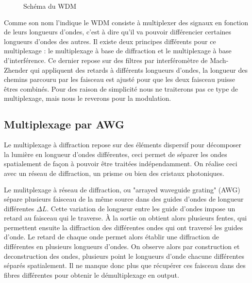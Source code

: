 \documentclass[oneside]{book}
\begin{document}
\begin{figure}[ht!]
			\caption{Schéma du WDM}
			\label{fig:WDM}
		\end{figure}


		Comme son nom l'indique le WDM consiste à multiplexer des signaux en fonction de leurs longueurs d'ondes, c'est à dire qu'il va pouvoir différencier certaines longueurs d'ondes des autres. Il existe deux principes différents pour ce multiplexage : le multiplexage à base de diffraction et le multiplexage à base d'interférence. Ce dernier repose sur des filtres par interféromètre de Mach-Zhender qui appliquent des retards à différents longueurs d'ondes, la longueur des chemins parcouru par les faisceau est ajusté pour que les deux faisceau puisse êtres combinés\cite{Open}. Pour des raison de simplicité nous ne traiterons pas ce type de multiplexage, mais nous le reverons pour la modulation.    

			\subsection{Multiplexage par AWG}

			Le multiplexage à diffraction repose sur des éléments dispersif pour décomposer la lumière en longueur d'ondes différentes, ceci permet de séparer les ondes spatialement de façon à pouvoir être traitées indépendamment. On réalise ceci avec un réseau de diffraction, un prisme ou bien des cristaux photoniques. 
			
			Le mulitplexage à réseau de diffraction, ou "arrayed waveguide grating" (AWG) sépare plusieurs faisceau de la même source dans des guides d'ondes de longueur différentes $\Delta L$. Cette variation de longueur entre les guide d'ondes impose un retard au faisceau qui le traverse. À la sortie on obtient alors plusieurs fentes, qui permettent ensuite la diffraction des différentes ondes qui ont traversé les guides d'onde. Le retard de chaque onde permet alors établir une diffraction de différentes en plusieurs longueurs d'ondes. On observe alors par construction et deconstruction des ondes, plusieurs point le longueurs d'onde chacune différentes séparés spatialement. Il ne manque donc plus que récupérer ces faisceau dans des fibres différentes pour obtenir le démultiplexage en output. 			
\end{document}
